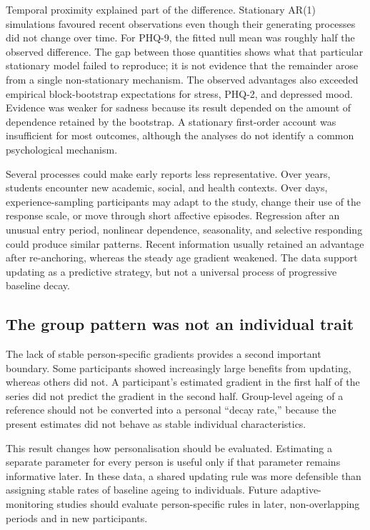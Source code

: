 \documentclass[pdflatex,sn-vancouver-num]{sn-jnl}
\begin{document}
Temporal proximity explained part of the difference. Stationary AR(1) simulations favoured recent observations even though their generating processes did not change over time. For PHQ-9, the fitted null mean was roughly half the observed difference. The gap between those quantities shows what that particular stationary model failed to reproduce; it is not evidence that the remainder arose from a single non-stationary mechanism. The observed advantages also exceeded empirical block-bootstrap expectations for stress, PHQ-2, and depressed mood. Evidence was weaker for sadness because its result depended on the amount of dependence retained by the bootstrap. A stationary first-order account was insufficient for most outcomes, although the analyses do not identify a common psychological mechanism.

Several processes could make early reports less representative. Over years, students encounter new academic, social, and health contexts. Over days, experience-sampling participants may adapt to the study, change their use of the response scale, or move through short affective episodes. Regression after an unusual entry period, nonlinear dependence, seasonality, and selective responding could produce similar patterns. Recent information usually retained an advantage after re-anchoring, whereas the steady age gradient weakened. The data support updating as a predictive strategy, but not a universal process of progressive baseline decay.

\subsection{The group pattern was not an individual trait}

The lack of stable person-specific gradients provides a second important boundary. Some participants showed increasingly large benefits from updating, whereas others did not. A participant's estimated gradient in the first half of the series did not predict the gradient in the second half. Group-level ageing of a reference should not be converted into a personal ``decay rate,'' because the present estimates did not behave as stable individual characteristics.

This result changes how personalisation should be evaluated. Estimating a separate parameter for every person is useful only if that parameter remains informative later. In these data, a shared updating rule was more defensible than assigning stable rates of baseline ageing to individuals. Future adaptive-monitoring studies should evaluate person-specific rules in later, non-overlapping periods and in new participants.
\end{document}
